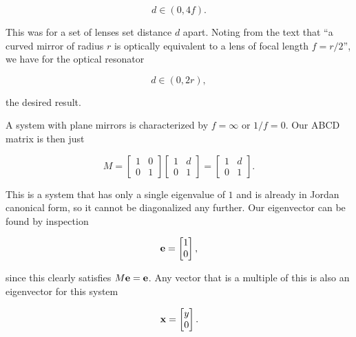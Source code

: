 {\begin{dmath}\label{eqn:problemSet4Problem2:1120}
d \in (0, 4 f).
\end{dmath}

This was for a set of lenses set distance $d$ apart.  Noting from the text that ``a curved mirror of radius $r$ is optically equivalent to a lens of focal length $f = r/2$'', we have for the optical resonator

\begin{dmath}\label{eqn:problemSet4Problem2:1140}
\boxed{
d \in (0, 2 r),
}
\end{dmath}

the desired result.


A system with plane mirrors is characterized by $f = \infty$ or $1/f = 0$.  Our ABCD matrix is then just

\begin{equation}\label{eqn:problemSet4Problem2:1160}
M =
\begin{bmatrix}
1 & 0 \\
0 & 1
\end{bmatrix}
\begin{bmatrix}
1 & d \\
0 & 1
\end{bmatrix}
=
\begin{bmatrix}
1 & d \\
0 & 1
\end{bmatrix}.
\end{equation}

This is a system that has only a single eigenvalue of $1$ and is already in Jordan canonical form, so it cannot be diagonalized any further.  Our eigenvector can be found by inspection

\begin{dmath}\label{eqn:problemSet4Problem2:640}
\Be =
\begin{bmatrix}
1 \\
0
\end{bmatrix},
\end{dmath}

since this clearly satisfies $M \mathbf{e} = \mathbf{e}$.  Any vector that is a multiple of this is also an eigenvector for this system

\begin{dmath}\label{eqn:problemSet4Problem2:660}
\Bx =
\begin{bmatrix}
y \\
0
\end{bmatrix}.
\end{dmath}

}
